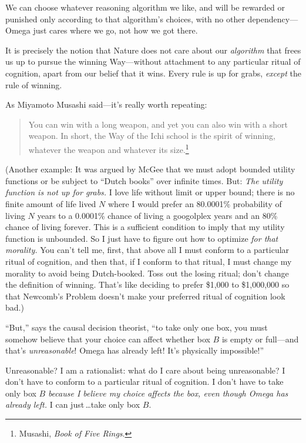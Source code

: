  We can choose whatever reasoning algorithm we like, and will be
rewarded or punished only according to that algorithm's
choices, with no other dependency---Omega just cares where we go, not
how we got there.


 It is precisely the notion that Nature does not care about our
\textit{algorithm} that frees us up to pursue the winning Way---without
attachment to any particular ritual of cognition, apart from our belief
that it wins. Every rule is up for grabs, \textit{except} the rule of
winning.


 As Miyamoto Musashi said---it's really worth
repeating:

\begin{quote}
{
 You can win with a long weapon, and yet you can also win with a
short weapon. In short, the Way of the Ichi school is the spirit of
winning, whatever the weapon and whatever its size.\footnote{Musashi, \textit{Book of Five Rings}.}}
\end{quote}


 (Another example: It was argued by McGee that we must adopt
bounded utility functions or be subject to ``Dutch
books'' over infinite times. But: \textit{The utility
function is not up for grabs.} I love life without limit or upper
bound; there is no finite amount of life lived $N$ where I would prefer
an 80.0001\% probability of living $N$ years to a 0.0001\% chance of
living a googolplex years and an 80\% chance of living forever. This is
a sufficient condition to imply that my utility function is unbounded.
So I just have to figure out how to optimize \textit{for that
morality.} You can't tell me, first, that above all I
must conform to a particular ritual of cognition, and then that, if I
conform to that ritual, I must change my morality to avoid being
Dutch-booked. Toss out the losing ritual; don't change
the definition of winning. That's like deciding to
prefer \$1,000 to \$1,000,000 so that Newcomb's Problem
doesn't make your preferred ritual of cognition look
bad.)


 ``But,'' says the causal
decision theorist, ``to take only one box, you must
somehow believe that your choice can affect whether box $B$ is empty or
full---and that's \textit{unreasonable}! Omega has
already left! It's physically
impossible!''

{
 Unreasonable? I am a rationalist: what do I care about being
unreasonable? I don't have to conform to a particular
ritual of cognition. I don't have to take only box $B$
\textit{because I believe my choice affects the box, even though Omega
has already left.} I can just\,\ldots take only box $B$.}


